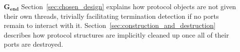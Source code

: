 \begin{enumerate}
	\item[$\boldsymbol{G_{end}}$] Section~\ref{sec:chosen_design} explains how protocol objects are not given their own threads, trivially facilitating termination detection if no ports remain to interact with it. Section~\ref{sec:construction_and_destruction} describes how protocol structures are implicitly cleaned up once all of their ports are destroyed. 
\end{enumerate}